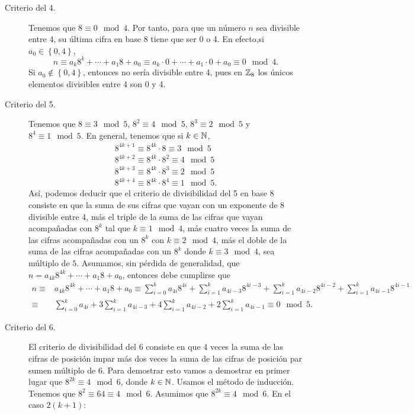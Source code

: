 \documentclass{article}
\begin{document}
\begin{sol}
\begin{description}
\item[Criterio del 4.] Tenemos que $\displaystyle 8 \equiv 0 \mod 4 $. Por tanto, para que un número $\displaystyle n $ sea divisible entre 4, su última cifra en base 8 tiene que ser 0 o 4. En efecto,si $\displaystyle a_{0} \in \left\{ 0,4\right\}  $,
	\[n \equiv a_{k}8^{k} + \cdots + a_{1}8+a_{0} \equiv a_{k} \cdot 0 + \cdots + a_{1} \cdot 0 + a_{0} \equiv 0 \mod 4 .\]
	Si $\displaystyle a_{0} \not\in \left\{ 0,4\right\}  $, entonces no sería divisible entre 4, pues en $\displaystyle \mathbb{Z}_{8} $ los únicos elementos divisibles entre 4 son 0 y 4.
\item[Criterio del 5.] Tenemos que $\displaystyle 8 \equiv 3 \mod 5 $, $\displaystyle 8^{2} \equiv 4 \mod 5 $, $\displaystyle 8 ^{3} \equiv 2 \mod 5 $ y $\displaystyle 8^{4} \equiv 1 \mod 5 $. En general, tenemos que si $\displaystyle k \in \mathbb{N} $,
	\[
	\begin{split}
	8^{4k+1} \equiv 8^{4k} \cdot 8 \equiv 3 \mod 5 \\
	8 ^{4k+2} \equiv 8^{4k} \cdot 8^{2} \equiv 4 \mod 5 \\
	8 ^{4k+3} \equiv 8^{4k} \cdot 8^{3} \equiv 2 \mod 5 \\
	8^{4k+4} \equiv 8^{4k} \cdot 8^{4} \equiv 1 \mod 5.
	\end{split}
	\]
Así, podemos deducir que el criterio de divisibilidad del 5 en base 8 consiste en que la suma de sus cifras que vayan con un exponente de 8 divisible entre 4, más el triple de la suma de las cifras que vayan acompañadas con $\displaystyle 8^{k} $ tal que $\displaystyle k \equiv 1 \mod 4 $, más cuatro veces la suma de las cifras acompañadas con un $\displaystyle 8^{k} $ con $\displaystyle k\equiv 2 \mod 4 $, más el doble de la suma de las cifras acompañadas con un $\displaystyle 8^{k} $ donde $\displaystyle k \equiv 3 \mod 4 $, sea múltiplo de $\displaystyle 5 $. Asumamos, sin pérdida de generalidad, que $\displaystyle n = a_{4k}8^{4k} + \cdots + a_{1}8 + a_{0} $, entonces debe cumplirse que
\[ 
\begin{split}
	n \equiv &  a_{4k}8^{4k} + \cdots + a_{1}8+a_{0} \equiv \sum^{k}_{i = 0}a_{4i}8^{4i} + \sum^{k}_{i=1}a_{4i-3}8^{4i-3} + \sum^{k}_{i=1}a_{4i-2}8^{4i-2} + \sum^{k}_{i=1}a_{4i-1}8^{4i-1} \\
	\equiv & \sum^{k}_{i = 0}a_{4i} + 3\sum^{k}_{i=1}a_{4i-3} + 4\sum^{k}_{i=1}a_{4i-2} + 2\sum^{k}_{i=1}a_{4i-1} \equiv 0 \mod 5.
\end{split}\]
\item[Criterio del 6.] El criterio de divisibilidad del 6 consiste en que 4 veces la suma de las cifras de posición impar más dos veces la suma de las cifras de posición par sumen múltiplo de 6. Para demostrar esto vamos a demostrar en primer lugar que $\displaystyle 8^{2k} \equiv 4 \mod 6 $, donde $\displaystyle k \in \mathbb{N} $. Usamos el método de inducción. Tenemos que $\displaystyle 8^{2} \equiv 64 \equiv 4 \mod 6 $. Asumimos que $\displaystyle 8^{2k} \equiv 4 \mod 6 $. En el caso $\displaystyle 2\left(k+1\right) $:

\end{description}
\end{sol}
\end{document}
